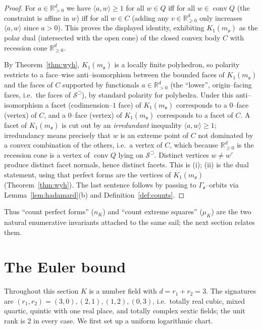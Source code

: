 \documentclass[11pt,reqno]{amsart}
\theoremstyle{plain}
\theoremstyle{definition}
\newcommand{\R}{\mathbb{R}}
\newcommand{\conv}{\operatorname{conv}}
\newcommand{\sail}{\mathcal{S}^{\sqsupset}}
\newcommand{\Ok}{\mathfrak{o}}
\newcommand{\nK}{n_K}
\newcommand{\muK}{\mu_K}
\begin{document}
\begin{proof}
For $a\in\R^d_{>0}$ we have $\langle a,w\rangle\ge1$ for all $w\in Q$ iff for all $w\in\conv Q$ (the
constraint is affine in $w$) iff for all $w\in C$ (adding any $v\in\R^d_{\ge0}$ only increases
$\langle a,w\rangle$ since $a>0$). This proves the displayed identity, exhibiting $K_1(m_\Ok)$ as the
polar dual (intersected with the open cone) of the closed convex body $C$ with recession cone
$\R^d_{\ge0}$.

By Theorem~\ref{thm:wyh}, $K_1(m_\Ok)$ is a locally finite polyhedron, so polarity restricts to a face--wise
anti--isomorphism between the bounded faces of $K_1(m_\Ok)$ and the faces of $C$ supported by functionals
$a\in\R^d_{>0}$ (the ``lower'', origin--facing faces, i.e.\ the faces of $\sail$), by standard polarity for
polyhedra. Under this anti--isomorphism a facet (codimension--$1$ face) of
$K_1(m_\Ok)$ corresponds to a $0$--face (vertex) of $C$, and a $0$--face (vertex) of $K_1(m_\Ok)$ corresponds
to a facet of $C$. A facet of $K_1(m_\Ok)$ is cut out by an \emph{irredundant} inequality
$\langle a,w\rangle\ge1$; irredundancy means precisely that $w$ is an extreme point of $C$ not dominated by a
convex combination of the others, i.e.\ a vertex of $C$, which because $\R^d_{\ge0}$ is the recession cone is
a vertex of $\conv Q$ lying on $\sail$. Distinct vertices $w\neq w'$ produce distinct facet normals, hence
distinct facets. This is (i); (ii) is the dual statement, using that perfect forms are the vertices of
$K_1(m_\Ok)$ (Theorem~\ref{thm:wyh}). The last sentence follows by passing to $\Gamma_\Ok$--orbits via
Lemma~\ref{lem:hadamard}(b) and Definition~\ref{def:counts}.
\end{proof}

Thus ``count perfect forms'' ($\nK$) and ``count extreme squares'' ($\muK$) are the two natural enumerative
invariants attached to the same sail; the next section relates them.

\section{The Euler bound}\label{sec:euler}

Throughout this section $K$ is a number field with $d=r_1+r_2=3$. The signatures are
$(r_1,r_2)=(3,0),(2,1),(1,2),(0,3)$, i.e.\ totally real cubic, mixed quartic, quintic with one real place,
and totally complex sextic fields; the unit rank is $2$ in every case. We first set up a uniform logarithmic chart.
\end{document}
